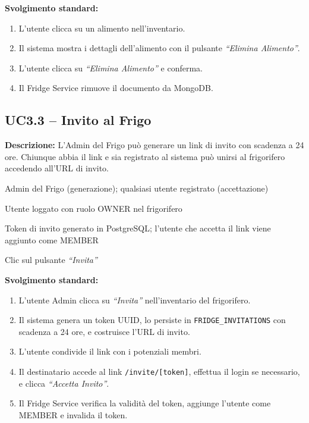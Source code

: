 \documentclass[12pt,a4paper,twoside]{report}
\newenvironment{ucbox}{%
  \begin{mdframed}[
    backgroundcolor=ucbg,
    linecolor=ucborder,
    linewidth=1pt,
    innerleftmargin=10pt,
    innerrightmargin=10pt,
    innertopmargin=8pt,
    innerbottommargin=8pt,
    roundcorner=4pt
  ]
}{%
  \end{mdframed}
}
\begin{document}
\textbf{Svolgimento standard:}
\begin{enumerate}
  \item L'utente clicca su un alimento nell'inventario.
  \item Il sistema mostra i dettagli dell'alimento con il pulsante \textit{``Elimina Alimento''}.
  \item L'utente clicca su \textit{``Elimina Alimento''} e conferma.
  \item Il Fridge Service rimuove il documento da MongoDB.
\end{enumerate}

\newpage
\subsection{UC3.3 -- Invito al Frigo}

\begin{ucbox}
\textbf{Descrizione:} L'Admin del Frigo può generare un link di invito con scadenza a 24 ore. Chiunque abbia il link e sia registrato al sistema può unirsi al frigorifero accedendo all'URL di invito.

\begin{description}[leftmargin=4cm, style=sameline]
  \item[Attori Coinvolti:] Admin del Frigo (generazione); qualsiasi utente registrato (accettazione)
  \item[Precondizione:] Utente loggato con ruolo OWNER nel frigorifero
  \item[Postcondizione:] Token di invito generato in PostgreSQL; l'utente che accetta il link viene aggiunto come MEMBER
  \item[Trigger:] Clic sul pulsante \textit{``Invita''}
\end{description}
\end{ucbox}

\textbf{Svolgimento standard:}
\begin{enumerate}
  \item L'utente Admin clicca su \textit{``Invita''} nell'inventario del frigorifero.
  \item Il sistema genera un token UUID, lo persiste in \texttt{FRIDGE\_INVITATIONS} con scadenza a 24 ore, e costruisce l'URL di invito.
  \item L'utente condivide il link con i potenziali membri.
  \item Il destinatario accede al link \texttt{/invite/[token]}, effettua il login se necessario, e clicca \textit{``Accetta Invito''}.
  \item Il Fridge Service verifica la validità del token, aggiunge l'utente come MEMBER e invalida il token.
\end{enumerate}
\end{document}
